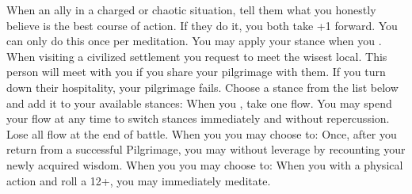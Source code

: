 \documentclass[darkmode]{dw_playbook}
\begin{document}
\begin{minipage}[t]{0.9\textwidth}
\begin{minipage}[t]{0.65\textwidth}
        \begin{multicols*}{2}
            {When an ally  in a charged or chaotic situation, tell them what you honestly believe is the best course of action.  If they do it, you both take +1 forward.  You can only do this once per meditation.}
            \vgap
                {You may apply your stance when you .}
            \vgap
                {When visiting a civilized settlement you request to meet the wisest local. This person will meet with you if you share your pilgrimage with them.  If you turn down their hospitality, your pilgrimage fails.}
            \vgap
                {Choose a stance from the list below and add it to your available stances:
                \vsgap
                \vsgap
                \vsgap
                }
            \vgap
                {When you , take one flow.  You may spend your flow at any time to switch stances immediately and without repercussion.  Lose all flow at the end of battle.}
            \vgap
                {When you  you may choose to:
                \vsgap
                }
                {Once, after you return from a successful Pilgrimage, you may  without leverage by recounting your newly acquired wisdom.}
            \vgap
                {When you  you may choose to:
                \vsgap
                }
            \vgap
                {When you  with a physical action and roll a 12+, you may immediately meditate.}

\end{multicols*}
\end{minipage}
\end{minipage}
\end{document}
